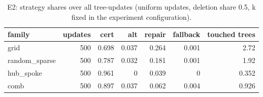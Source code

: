\begin{table}[t]
\centering
\caption{E2: strategy shares over all tree-updates (uniform updates, deletion share 0.5, k fixed in the experiment configuration).}
\label{tab:e2shares}
\small
\begin{tabular}{lrrrrrr}
\hline
family & updates & cert & alt & repair & fallback & touched trees \\
\hline
grid & 500 & 0.698 & 0.037 & 0.264 & 0.001 & 2.72 \\
random\_sparse & 500 & 0.787 & 0.032 & 0.181 & 0.001 & 1.92 \\
hub\_spoke & 500 & 0.961 & 0 & 0.039 & 0 & 0.352 \\
comb & 500 & 0.897 & 0.037 & 0.062 & 0.004 & 0.926 \\
\hline
\end{tabular}
\end{table}
